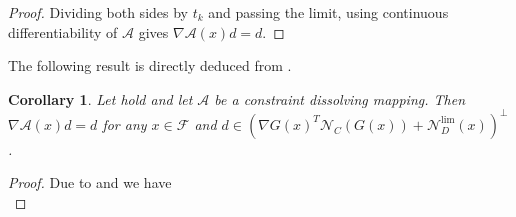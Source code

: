 \documentclass[11pt,a4paper,reqno]{amsart}
\newtheorem{corollary}[theorem]{Corollary}
\begin{document}
{\begin{proof}
Dividing both sides by $t_k$ and passing the limit, using continuous differentiability of $\mathcal A$ gives
$\nabla \mathcal A(x)d = d$.
%
\end{proof}
The following result is directly deduced from .
\begin{corollary}\label{Cor:1}
   Let  hold and let $\mathcal A$ be a constraint dissolving mapping. Then $\nabla \mathcal A (x) d=d$ for any $x\in \mathcal F$ and $d\in \left(\nabla G(x)^T\mathcal N_C(G(x))+\mathcal N_D^{\text{lim}}(x)\right)^{\perp}$.
\end{corollary}
\begin{proof}
Due to  and  we have
\begin{equation}\label{Eq:NormalconeFeasi}

\end{equation}
\end{proof}}
\end{document}
